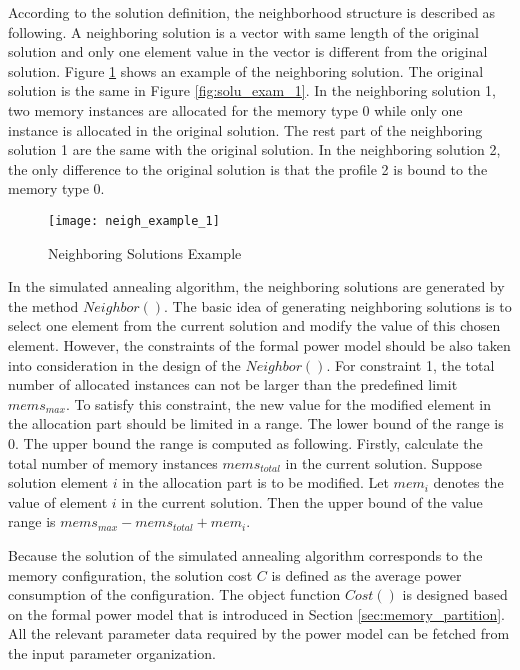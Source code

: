 	According to the solution definition, the neighborhood structure is described
	as following. A neighboring solution is a vector with same length of the
	original solution and only one element value in the vector is different from the
	original solution. Figure \ref{fig:neigh_solu_exam_1} shows an example of the
	neighboring solution. The original solution is the same in Figure
	\ref{fig:solu_exam_1}. In the neighboring solution 1, two memory instances are
	allocated for the memory type 0 while only one instance is allocated in
	the original solution. The rest part of the neighboring solution 1 are the
	same with the original solution. In the neighboring solution 2, the only
	difference to the original solution is that the profile 2 is bound to the
	memory type 0.
	\begin{figure}[b]
		\begin{center}
			\texttt{[image: neigh\_example\_1]}
			\caption{Neighboring Solutions Example}
			\label{fig:neigh_solu_exam_1}
		\end{center}
	\end{figure}	
	In the simulated annealing algorithm, the neighboring solutions are generated by
	the method $Neighbor()$. The basic idea of generating neighboring solutions
	is to select one element from the current solution and modify the value of this
	chosen element.
	However, the constraints of the formal power model should be also taken into
	consideration in the design of the $Neighbor()$.
	For constraint 1, the total number of allocated instances can not be larger than
	the predefined limit $mems_{max}$. To satisfy this constraint, the new value for
	the modified element in the allocation part should be limited in a range.
	The lower bound of the range is 0. The upper bound the range is computed as following.
	Firstly, calculate the total number of memory instances $mems_{total}$ in the
	current solution. Suppose solution element $i$ in the allocation part is to be modified.
	Let $mem_{i}$ denotes the value of element $i$ in the current solution.
	Then the upper bound of the value range is $mems_{max}-mems_{total}+mem_{i}$.
	
	Because the solution of the simulated annealing algorithm corresponds to the
	memory configuration, the solution cost $C$ is defined as the average power
	consumption of the configuration. The object function $Cost()$ is designed
	based on the formal power model that is introduced in Section
	\ref{sec:memory_partition}. All the relevant parameter data required by the
	power model can be fetched from the input parameter organization.
	
